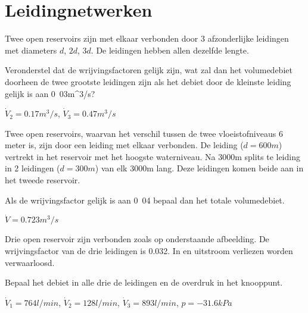 \chapter{Leidingnetwerken}
\label{sec:Leidingnetwerken}
\begin{toepassing}
	\label{parallelle leidingen}
Twee open reservoirs zijn met elkaar verbonden door 3 afzonderlijke leidingen met diameters $d$, $2d$, $3d$. De leidingen hebben allen dezelfde lengte.
		
	Veronderstel dat de wrijvingsfactoren gelijk zijn, wat zal dan het volumedebiet doorheen de twee grootste leidingen zijn als het debiet door de kleinste leiding gelijk is aan \unit{0.03}{m^3/s}? 
\end{toepassing}
\begin{antwoord}
	$\dot{V}_2 = \unit{0.17}{m^3/s}$, $\dot{V}_3 = \unit{0.47}{m^3/s}$
\end{antwoord}
\begin{toepassing*}
	\label{gesplitste leiding}
Twee open reservoirs, waarvan het verschil tussen de twee vloeistofniveaus 6 meter is, zijn door een leiding met elkaar verbonden. De leiding ($d=\unit{600}{m}$) vertrekt in het reservoir met het hoogste waterniveau. Na \unit{3000}{m} splits te leiding in 2 leidingen ($d=\unit{300}{m}$) van elk \unit{3000}{m} lang. Deze leidingen komen beide aan in het tweede reservoir. 
		
	Als de wrijvingsfactor gelijk is aan \unit{0.04}{} bepaal dan het totale volumedebiet. 
\end{toepassing*}
\begin{antwoord}
		$\dot{V} = \unit{0.723}{m^3/s}$
\end{antwoord}
\begin{toepassing*}
	\label{3_reservoirs}
Drie open reservoir zijn verbonden zoals op onderstaande afbeelding. De wrijvingsfactor van de drie leidingen is 0.032. In en uitstroom verliezen worden verwaarloosd.
		
	Bepaal het debiet in alle drie de leidingen en de overdruk in het knooppunt.
		
	\begin{center}
		
	\end{center}
\end{toepassing*}
\begin{antwoord}
		$\dot{V}_1 = \unit{764}{l/min}$, $\dot{V}_2 = \unit{128}{l/min}$, $\dot{V}_3 = \unit{893}{l/min}$, $p=\unit{-31.6}{kPa}$
\end{antwoord}
